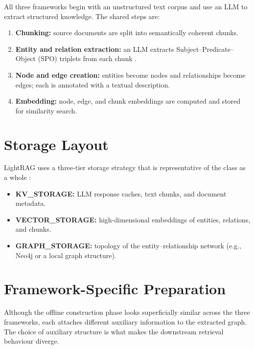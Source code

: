 \documentclass[12pt,a4paper,oneside]{report}
\begin{document}
All three frameworks begin with an unstructured text corpus and use an LLM
to extract structured knowledge. The shared steps are:
\begin{enumerate}[leftmargin=2em,itemsep=2pt]
    \item \textbf{Chunking:} source documents are split into semantically
          coherent chunks.
    \item \textbf{Entity and relation extraction:} an LLM extracts
          Subject--Predicate--Object (SPO) triplets from each chunk
          \citep{guo2025lightrag}.
    \item \textbf{Node and edge creation:} entities become nodes and
          relationships become edges; each is annotated with a textual
          description.
    \item \textbf{Embedding:} node, edge, and chunk embeddings are computed
          and stored for similarity search.
\end{enumerate}

\section{Storage Layout}

LightRAG uses a three-tier storage strategy that is representative of the
class as a whole \citep{guo2025lightrag}:
\begin{itemize}[leftmargin=2em,itemsep=2pt]
    \item \textbf{KV\_STORAGE:} LLM response caches, text chunks, and
          document metadata.
    \item \textbf{VECTOR\_STORAGE:} high-dimensional embeddings of entities,
          relations, and chunks.
    \item \textbf{GRAPH\_STORAGE:} topology of the entity--relationship
          network (e.g., Neo4j or a local graph structure).
\end{itemize}

\section{Framework-Specific Preparation}

Although the offline construction phase looks superficially similar
across the three frameworks, each attaches different auxiliary
information to the extracted graph. The choice of auxiliary structure
is what makes the downstream retrieval behaviour diverge.
\end{document}
